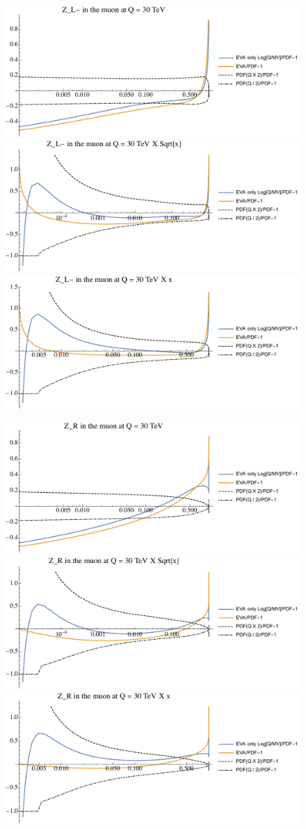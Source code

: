 \documentclass[a4paper,11pt]{article}
\begin{document}
\begin{figure}[ht]
\includegraphics[width=0.4\linewidth]{PlotPDFs/ratios/30TeV/Z_L-_Q.pdf}
\includegraphics[width=0.4\linewidth]{PlotPDFs/ratios/30TeV/Z_L-_Qsqrtx.pdf}
\includegraphics[width=0.4\linewidth]{PlotPDFs/ratios/30TeV/Z_L-_Qx.pdf}
\end{figure}

\begin{figure}[ht]
\includegraphics[width=0.4\linewidth]{PlotPDFs/ratios/30TeV/Z_R_Q.pdf}
\includegraphics[width=0.4\linewidth]{PlotPDFs/ratios/30TeV/Z_R_Qsqrtx.pdf}
\includegraphics[width=0.4\linewidth]{PlotPDFs/ratios/30TeV/Z_R_Qx.pdf}
\end{figure}
\end{document}
